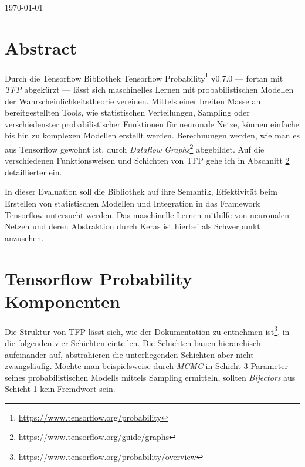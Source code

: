 \documentclass[12pt]{article}
\begin{document}
\begin{titlepage}
\begin{center}

\vspace{\fill} %

{\large \today}\\[3cm] %

\end{center}

\end{titlepage}



\tableofcontents

\newpage


\section{Abstract}
\label{abstract}
Durch die Tensorflow Bibliothek Tensorflow Probability\footnote{\url{https://www.tensorflow.org/probability}} v0.7.0 --- fortan mit \textit{TFP} abgekürzt --- lässt sich maschinelles Lernen mit probabilistischen Modellen der Wahrscheinlichkeitstheorie vereinen. Mittels einer breiten Masse an bereitgestellten Tools, wie statistischen Verteilungen, Sampling oder verschiedenster probabilistischer Funktionen für neuronale Netze, können einfache bis hin zu komplexen Modellen erstellt werden. Berechnungen werden, wie man es aus Tensorflow gewohnt ist, durch \textit{Dataflow Graphs}\footnote{\url{https://www.tensorflow.org/guide/graphs}} abgebildet. Auf die verschiedenen Funktionsweisen und Schichten von TFP gehe ich in Abschnitt \ref{sec:tfp-components} detaillierter ein.

In dieser Evaluation soll die Bibliothek auf ihre Semantik, Effektivität beim Erstellen von statistischen Modellen und Integration in das Framework Tensorflow untersucht werden. Das maschinelle Lernen mithilfe von neuronalen Netzen und deren Abstraktion durch Keras ist hierbei als Schwerpunkt anzusehen.

\section{Tensorflow Probability Komponenten}
\label{sec:tfp-components}
Die Struktur von TFP lässt sich, wie der Dokumentation zu entnehmen ist\footnote{\url{https://www.tensorflow.org/probability/overview}}, in die folgenden vier Schichten einteilen. Die Schichten bauen hierarchisch aufeinander auf, abstrahieren die unterliegenden Schichten aber nicht zwangsläufig. Möchte man beispielsweise durch \textit{MCMC} in Schicht 3 Parameter seines probabilistischen Modells mittels Sampling ermitteln, sollten \textit{Bijectors} aus Schicht 1 kein Fremdwort sein.
\end{document}
